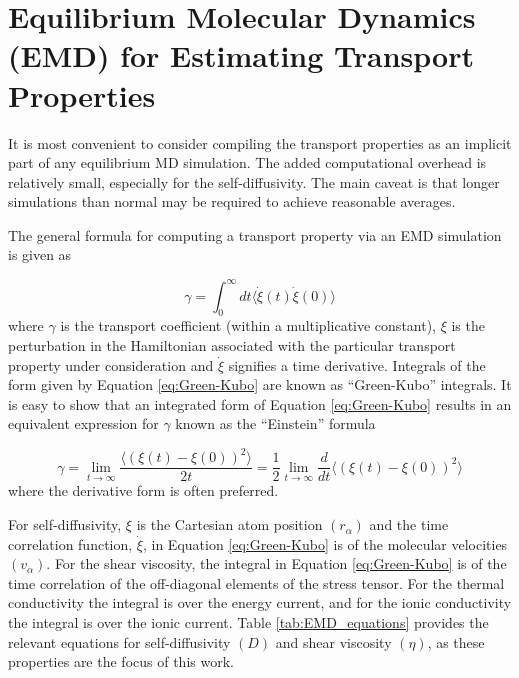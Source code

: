 \documentclass[9pt,bestpractices]{livecoms}
\begin{document}
\section{Equilibrium Molecular Dynamics (EMD) for Estimating Transport Properties}

It is most convenient to consider compiling the transport properties as an implicit part of any equilibrium MD simulation. The added computational overhead is relatively small, especially for the self-diffusivity. The main caveat is that longer simulations than normal may be required to achieve reasonable averages.

The general formula for computing a transport property via an EMD simulation is given as

\begin{equation} \label{eq:Green-Kubo}
\gamma = \int_{0}^{\infty}dt\langle\dot{\xi}(t)\dot{\xi}(0)\rangle
\end{equation}
where $\gamma$ is the transport coefficient (within a multiplicative constant), $\xi$ is the perturbation in the Hamiltonian associated with the particular transport property under consideration and $\dot{\xi}$ signifies a time derivative. Integrals of the form given by Equation \ref{eq:Green-Kubo} are known as “Green-Kubo” integrals. It is easy to show that an integrated form of Equation \ref{eq:Green-Kubo} results in an equivalent expression for $\gamma$ known as the “Einstein” formula

\begin{equation} \label{eq:Einstein}
\gamma = \lim_{t\to\infty} \frac{\langle (\xi(t)-\xi(0))^2 \rangle}{2t} = \frac{1}{2} \lim_{t\to\infty} \frac{d}{dt} \langle (\xi(t)-\xi(0))^2 \rangle
\end{equation}
where the derivative form is often preferred.

For self-diffusivity, $\xi$ is the Cartesian atom position $(r_{\alpha})$ and the time correlation function, $\dot{\xi}$, in Equation \ref{eq:Green-Kubo} is of the molecular velocities $(v_{\alpha})$. For the shear viscosity, the integral in Equation \ref{eq:Green-Kubo} is of the time correlation of the off-diagonal elements of the stress tensor. For the thermal conductivity the integral is over the energy current, and for the ionic conductivity the integral is over the ionic current. Table \ref{tab:EMD_equations} provides the relevant equations for self-diffusivity $(D)$ and shear viscosity $(\eta)$, as these properties are the focus of this work.

\end{document}
